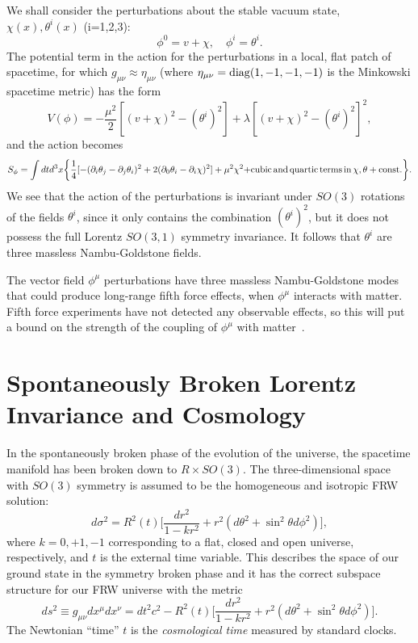 \documentclass[a4paper,12pt]{article}
\begin{document}
We shall consider the perturbations about the stable vacuum state, $\chi(x),
\theta^i(x)$ (i=1,2,3):
\begin{equation}
\phi^0=v+\chi, \quad \phi^i=\theta^i.
\end{equation}
The potential term in the action for the perturbations in a local, flat patch of
spacetime, for which $g_{\mu\nu}\approx\eta_{\mu\nu}$ (where $\eta_{\mu\nu}={\rm
diag}(1,-1,-1,-1)$ is the Minkowski spacetime metric) has the form
\begin{equation}
V(\phi)=-\frac{\mu^2}{2}[(v+\chi)^2-(\theta^i)^2]+\lambda[(v+\chi)^2-(\theta^i)^2]^2,
\end{equation}
and the action becomes
\begin{equation}
S_\phi=\int dtd^3x\biggl\{\frac{1}{4}[-(\partial_i\theta_j-\partial_j\theta_i)^2
+2(\partial_0\theta_i-\partial_i\chi)^2]+\mu^2\chi^2
$$ $$
+{\rm cubic\, and\, quartic\,
terms\, in\, \chi,\theta}+{\rm const.}\biggr\}.
\end{equation}
We see that the action of the perturbations is invariant under $SO(3)$ rotations
of the fields $\theta^i$, since it only contains the combination $(\theta^i)^2$,
but it does not possess the full Lorentz $SO(3,1)$ symmetry invariance. It follows
that $\theta^i$ are three massless Nambu-Goldstone fields.

The vector field $\phi^\mu$ perturbations have three massless Nambu-Goldstone modes
that could produce long-range fifth force effects, when $\phi^\mu$ interacts with
matter. Fifth force experiments have not detected any observable effects, so this
will put a bound on the strength of the coupling of $\phi^\mu$ with
matter~\cite{Fischbach}.

\section{\bf Spontaneously Broken Lorentz Invariance and Cosmology}

In the spontaneously broken phase of the evolution of the universe, the
spacetime manifold has been broken down to $R\times SO(3)$. The
three-dimensional space with $SO(3)$ symmetry is assumed to be the
homogeneous and isotropic FRW solution:
\begin{equation}
d\sigma^2=R^2(t)\biggl[\frac{dr^2}{1-kr^2}+r^2(d\theta^2+\sin^2\theta
d\phi^2)\biggr],
\end{equation}
where $k=0,+1,-1$ corresponding to a flat, closed and open universe,
respectively, and $t$ is the external time variable. This describes the
space of our ground state in the symmetry broken phase and it has
the correct subspace structure for our FRW universe with the metric
\begin{equation}
\label{metric}
ds^2\equiv
g_{\mu\nu}dx^\mu
dx^\nu=dt^2c^2-R^2(t)\biggl[\frac{dr^2}{1-kr^2}+r^2(d\theta^2+\sin^2\theta
d\phi^2)\biggr].
\end{equation}
The Newtonian ``time'' $t$ is the {\it cosmological time} measured by
standard clocks.
\end{document}
